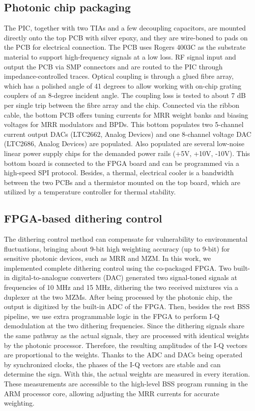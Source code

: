\documentclass[pdflatex,mathphys]{sty}%
\begin{document}
\subsection{Photonic chip packaging}
The PIC, together with two TIAs and a few decoupling capacitors, are mounted directly onto the top PCB with silver epoxy, and they are wire-boned to pads on the PCB for electrical connection. The PCB uses Rogers 4003C as the substrate material to support high-frequency signals at a low loss. RF signal input and output the PCB via SMP connectors and are routed to the PIC through impedance-controlled traces. Optical coupling is through a glued fibre array, which has a polished angle of 41 degrees to allow working with on-chip grating couplers of an 8-degree incident angle. The coupling loss is tested to about 7 dB per single trip between the fibre array and the chip. Connected via the ribbon cable, the bottom PCB offers tuning currents for MRR weight banks and biasing voltages for MRR modulators and BPDs. This bottom populates two 5-channel current output DACs (LTC2662, Analog Devices) and one 8-channel voltage DAC (LTC2686, Analog Devices) are populated. Also populated are several low-noise linear power supply chips for the demanded power rails (+5V, +10V, -10V). This bottom board is connected to the FPGA board and can be programmed via a high-speed SPI protocol. Besides, a thermal, electrical cooler is a bandwidth between the two PCBs and a thermistor mounted on the top board, which are utilized by a temperature controller for thermal stability.


\subsection{FPGA-based dithering control}
The dithering control method can compensate for vulnerability to environmental fluctuations, bringing about 9-bit high weighting accuracy (up to 9-bit) for sensitive photonic devices, such as MRR and MZM. In this work, we implemented complete dithering control using the co-packaged FPGA. Two built-in digital-to-analogue converters (DAC) generated two signal-toned signals at frequencies of 10 MHz and 15 MHz, dithering the two received mixtures via a duplexer at the two MZMs. After being processed by the photonic chip, the output is digitized by the built-in ADC of the FPGA. Then, besides the rest BSS pipeline, we use extra programmable logic in the FPGA to perform I-Q demodulation at the two dithering frequencies. Since the dithering signals share the same pathway as the actual signals, they are processed with identical weights by the photonic processor. Therefore, the resulting amplitudes of the I-Q vectors are proportional to the weights. Thanks to the ADC and DACs being operated by synchronized clocks, the phases of the I-Q vectors are stable and can determine the sign. With this, the actual weights are measured in every iteration. These measurements are accessible to the high-level BSS program running in the ARM processor core, allowing adjusting the MRR currents for accurate weighting.
\end{document}

